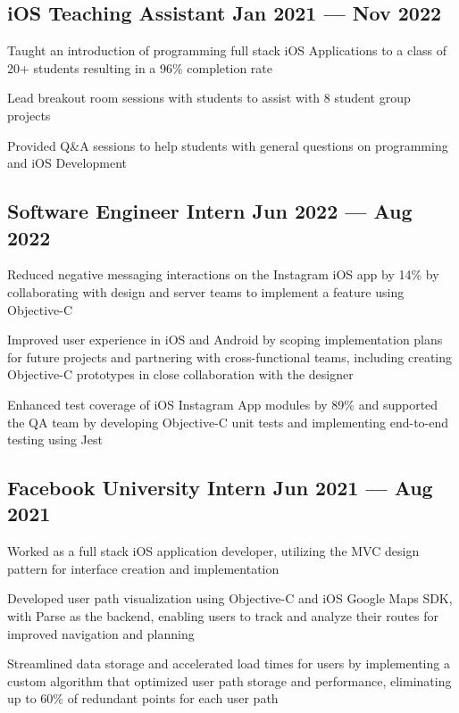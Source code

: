 
\subsection{{iOS Teaching Assistant \hfill Jan 2021 --- Nov 2022}}
\begin{zitemize}
\item Taught an introduction of programming full stack iOS Applications to a class of 20+ students resulting in a 96\% completion rate
\item Lead breakout room sessions with students to assist with 8 student group projects
\item Provided Q\&A sessions to help students with general questions on programming and iOS Development
\end{zitemize}


\subsection{{Software Engineer Intern \hfill Jun 2022 --- Aug 2022}}
\begin{zitemize}
\item Reduced negative messaging interactions on the Instagram iOS app by 14\% by collaborating with design and server teams to implement a feature using Objective-C
\item Improved user experience in iOS and Android by scoping implementation plans for future projects and partnering with cross-functional teams, including creating Objective-C prototypes in close collaboration with the designer
\item Enhanced test coverage of iOS Instagram App modules by 89\% and supported the QA team by developing Objective-C unit tests and implementing end-to-end testing using Jest
\end{zitemize}

% 
\subsection{{Facebook University Intern \hfill Jun 2021 --- Aug 2021}}
\begin{zitemize}
\item Worked as a full stack iOS application developer, utilizing the MVC design pattern for interface creation and implementation
\item Developed user path visualization using Objective-C and iOS Google Maps SDK, with Parse as the backend, enabling users to track and analyze their routes for improved navigation and planning
\item Streamlined data storage and accelerated load times for users by implementing a custom algorithm that optimized user path storage and performance, eliminating up to 60\% of redundant points for each user path
\end{zitemize}

